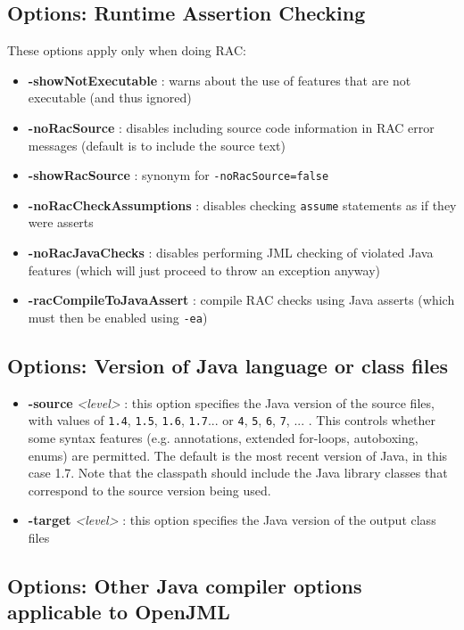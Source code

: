 \documentclass{report}%
\begin{document}
\subsection{Options: Runtime Assertion Checking}
\label{OptionsVersion}

These options apply only when doing RAC:
\begin{itemize}
\item \textbf{-showNotExecutable} : warns about the use of features that are not executable (and thus ignored)
\item \textbf{-noRacSource} : disables including source code information in RAC error messages (default is to include the source text)
\item \textbf{-showRacSource} : synonym for {\tt -noRacSource=false}
\item \textbf{-noRacCheckAssumptions} : disables checking \texttt{assume} statements as if they were asserts
\item \textbf{-noRacJavaChecks} : disables performing JML checking of violated Java features (which will just proceed to throw an exception anyway)
\item \textbf{-racCompileToJavaAssert} : compile RAC checks using Java asserts (which must then be enabled using \texttt{-ea})
\end{itemize}

\subsection{Options: Version of Java language or class files}

\begin{itemize}
\item \textbf{-source} {\it <level>} : this option specifies the Java version of the source files, with values of {\tt 1.4}, {\tt 1.5}, {\tt 1.6}, {\tt 1.7}... or {\tt 4}, {\tt 5}, {\tt 6}, {\tt 7}, ... . This controls whether some syntax features  
(e.g. annotations, extended for-loops, autoboxing, enums) are permitted. The default is the most recent version
of Java, in this case 1.7.  Note that the classpath should include the Java library classes that
correspond to the source version being used.

\item \textbf{-target} {\it <level>} : this option specifies the Java version of the output class files
\end{itemize}


\subsection{Options: Other Java compiler options applicable to OpenJML}
\end{document}
